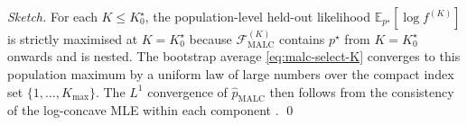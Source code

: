 \begin{proof}[Sketch]
For each $K \le K^{\star}_{0}$, the population-level held-out likelihood
$\mathbb{E}_{p^{\star}}[\log f^{(K)}]$ is strictly maximised at
$K = K^{\star}_{0}$ because $\mathcal{F}_{\mathrm{MALC}}^{(K)}$ contains
$p^{\star}$ from $K = K^{\star}_{0}$ onwards and is nested. The bootstrap
average \eqref{eq:malc-select-K} converges to this population maximum by a
uniform law of large numbers over the compact index set
$\{1,\dots,K_{\max}\}$. The $L^{1}$ convergence of $\hat{p}_{\mathrm{MALC}}$
then follows from the consistency of the log-concave MLE within each
component \citep{cule2010maximum,doss2016global}.
\qed
\end{proof}

